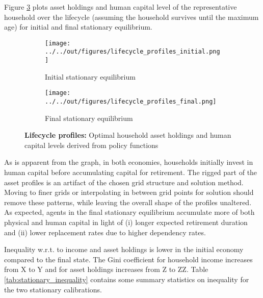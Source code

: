 Figure \ref{fig:lifecycle_profiles} plots asset holdings and human capital level of the representative household over the lifecycle (assuming the household survives until the maximum age) for initial and final stationary equilibrium.

\begin{figure}[ht]
    \centering
    \begin{subfigure}[b]{0.45\textwidth}
        \centering
        \texttt{[image: ../../out/figures/lifecycle\_profiles\_initial.png]}
        \caption{Initial stationary equilibrium}
        \label{fig:lifecycle_profiles_initial}
    \end{subfigure}
    \hfill
    \begin{subfigure}[b]{0.45\textwidth}
        \centering
        \texttt{[image: ../../out/figures/lifecycle\_profiles\_final.png]}
        \caption{Final stationary equilibrium}
        \label{fig:lifecycle_profiles_final}
    \end{subfigure}
    \caption{\textbf{Lifecycle profiles:} Optimal household asset holdings and human capital levels derived from policy functions}
    \label{fig:lifecycle_profiles}
\end{figure}

As is apparent from the graph, in both economies, households initially invest in human capital before accumulating capital for retirement. The rigged part of the asset profiles is an artifact of the chosen grid structure and solution method. Moving to finer grids or interpolating in between grid points for solution should remove these patterns, while leaving the overall shape of the profiles unaltered. As expected, agents in the final stationary equilibrium accumulate more of both physical and human capital in light of (i) longer expected retirement duration and (ii) lower replacement rates due to higher dependency rates.

Inequality w.r.t. to income and asset holdings is lower in the initial economy compared to the final state. The Gini coefficient for household income increases from X to Y and for asset holdings increases from Z to ZZ. Table \ref{tab:stationary_inequality} contains some summary statistics on inequality for the two stationary calibrations.

